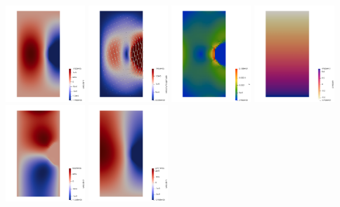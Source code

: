 \begin{center}
\includegraphics[width=3cm]{python_codes/fieldstone_02/results/v1}
\includegraphics[width=3cm]{python_codes/fieldstone_02/results/vel1}
\includegraphics[width=3cm]{python_codes/fieldstone_02/results/sr1}
\includegraphics[width=3cm]{python_codes/fieldstone_02/results/p1}\\
\includegraphics[width=3cm]{python_codes/fieldstone_02/results/u2}
\includegraphics[width=3cm]{python_codes/fieldstone_02/results/v2}

\end{center}
